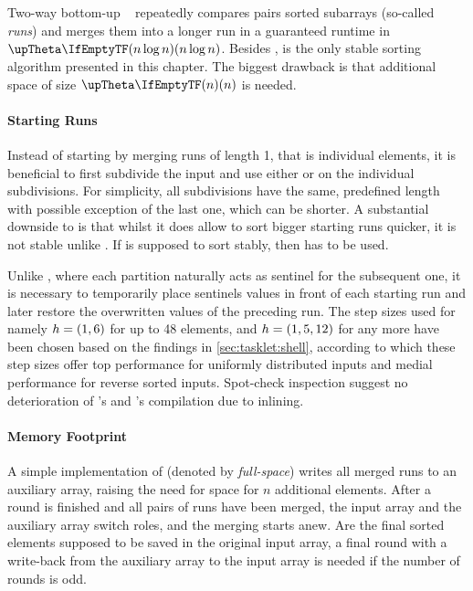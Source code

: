 \section{\texorpdfstring{\MS{}}{MergeSort}}
\label{sec:tasklet:merge}

Two-way bottom-up \MS{}~\cites{katajainen1997meticulous}[85\psq]{maurer1974datenstrukturen}[Chapter~2.3.1]{wirth1975algorithmen} repeatedly compares pairs sorted subarrays (so-called \emph{runs}) and merges them into a longer run in a guaranteed runtime in \(\bigtheta{n \log n}\).
Besides \IS{}, \MS{} is the only stable sorting algorithm presented in this chapter.
The biggest drawback is that additional space of size \(\bigtheta{n}\) is needed.


\paragraph{Starting Runs}
Instead of starting by merging runs of length 1, that is individual elements, it is beneficial to first subdivide the input and use either \IS{} or \ShS{} on the individual subdivisions.
For simplicity, all subdivisions have the same, predefined length with possible exception of the last one, which can be shorter.
A substantial downside to \ShS{} is that whilst it does allow to sort bigger starting runs quicker, it is not stable unlike \IS{}.
If \MS{} is supposed to sort stably, then \IS{} has to be used.

Unlike \QS{}, where each partition naturally acts as sentinel for the subsequent one, it is necessary to temporarily place sentinels values in front of each starting run and later restore the overwritten values of the preceding run.
The step sizes used for \ShS{} \Dash namely \(h = (1, 6)\) for up to 48 elements, and \(h = (1, 5, 12)\) for any more \Dash have been chosen based on the findings in \cref{sec:tasklet:shell}, according to which these step sizes offer top performance for uniformly distributed inputs and medial performance for reverse sorted inputs.
Spot-check inspection suggest no deterioration of \IS{}'s and \ShS{}'s compilation due to inlining.


\paragraph{Memory Footprint}
A simple implementation of \MS{} (denoted by \emph{full-space}) writes all merged runs to an auxiliary array, raising the need for space for \(n\) additional elements.
After a round is finished and all pairs of runs have been merged, the input array and the auxiliary array switch roles, and the merging starts anew.
Are the final sorted elements supposed to be saved in the original input array, a final round with a write-back from the auxiliary array to the input array is needed if the number of rounds is odd.

